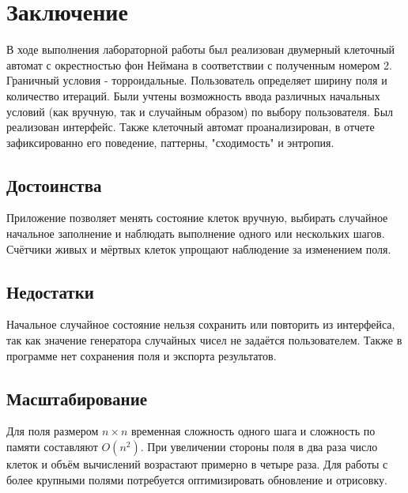 \section*{Заключение}


В ходе выполнения лабораторной работы был реализован двумерный клеточный автомат с окрестностью фон Неймана в соответствии с полученным номером 2. Граничный условия - торроидальные. Пользователь определяет ширину поля и количество итераций. Были учтены возможность ввода различных начальных условий (как вручную, так и случайным образом) по выбору пользователя. Был реализован интерфейс. Также клеточный автомат проанализирован, в отчете зафиксированно его поведение, паттерны, "сходимость" и энтропия.

\subsection*{Достоинства}

Приложение позволяет менять состояние клеток вручную, выбирать случайное
начальное заполнение и наблюдать выполнение одного или нескольких шагов.
Счётчики живых и мёртвых клеток упрощают наблюдение за изменением поля.

\subsection*{Недостатки}

Начальное случайное состояние нельзя сохранить или повторить из интерфейса,
так как значение генератора случайных чисел не задаётся пользователем.
Также в программе нет сохранения поля и экспорта результатов.

\subsection*{Масштабирование}

Для поля размером $n\times n$ временная сложность одного шага и сложность
по памяти составляют $O(n^2)$. При увеличении стороны поля в два раза число
клеток и объём вычислений возрастают примерно в четыре раза. Для работы с
более крупными полями потребуется оптимизировать обновление и отрисовку.
